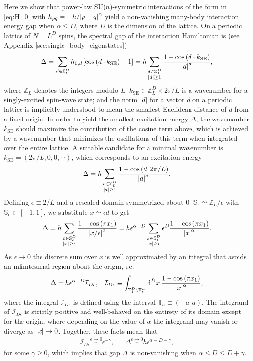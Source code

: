 \documentclass[nofootinbib,notitlepage,11pt]{revtex4-2}
\renewcommand{\t}{\text} %
\newcommand{\f}[2]{\dfrac{#1}{#2}} %
\newcommand{\p}[1]{\left(#1\right)} %
\renewcommand{\sp}[1]{\left[#1\right]} %
\renewcommand{\c}{\cdot} %
\newcommand{\1}{\mathds{1}}
\renewcommand{\d}{\text{d}}
\newcommand{\I}{\mathcal{I}}
\renewcommand{\SS}{\mathbb{S}}
\newcommand{\TT}{\mathbb{T}}
\newcommand{\ZZ}{\mathbb{Z}}
\begin{document}
Here we show that power-law SU($n$)-symmetric interactions of the form
in \eqref{eq:H_0} with $h_{pq}=-h/\abs{p-q}^\alpha$ yield a
non-vanishing many-body interaction energy gap when $\alpha\le D$,
where $D$ is the dimension of the lattice.  On a periodic lattice of
$N=L^D$ spins, the spectral gap of the interaction Hamiltonian is (see
Appendix \ref{sec:single_body_eigenstates})
\begin{align}
  \Delta
  = \sum_{d\in\ZZ_L^D} h_{0,d} \sp{\cos\p{d \c k_{\t{SE}}}-1}
  = h \sum_{\substack{d\in\ZZ_L^D\\\abs{d}\ge1}}
  \f{1-\cos\p{d \c k_{\t{SE}}}}{\abs{d}^\alpha},
\end{align}
where $\ZZ_L$ denotes the integers modulo $L$;
$k_{\t{SE}}\in\ZZ_L^D\times2\pi/L$ is a wavenumber for a
singly-excited spin-wave state; and the norm $\abs{d}$ for a vector
$d$ on a periodic lattice is implicitly understood to mean the
smallest Euclidean distance of $d$ from a fixed origin.  In order to
yield the smallest excitation energy $\Delta$, the wavenumber
$k_{\t{SE}}$ should maximize the contribution of the cosine term
above, which is achieved by a wavenumber that minimizes the
oscillations of this term when integrated over the entire lattice.  A
suitable candidate for a minimal wavenumber is
$k_{\t{SE}}=\p{2\pi/L,0,0,\cdots}$, which corresponds to an excitation
energy
\begin{align}
  \Delta = h \sum_{\substack{d\in\ZZ_L^D\\\abs{d}\ge1}}
  \f{1-\cos\p{d_12\pi/L}}{\abs{d}^\alpha}.
\end{align}
Defining $\epsilon\equiv2/L$ and a rescaled domain symmetrized about
$0$, $\SS_\epsilon\simeq\ZZ_L/\epsilon$ with
$\SS_\epsilon\subset\sp{-1,1}$, we substitute $x\simeq\epsilon d$ to
get
\begin{align}
  \Delta
  = h \sum_{\substack{x\in\SS_\epsilon^D\\\abs{x}\ge\epsilon}}
  \f{1-\cos\p{\pi x_1}}{\abs{x/\epsilon}^\alpha}
  = h \epsilon^{\alpha-D} \sum_{\substack{x\in\SS_L^D\\\abs{x}\ge\epsilon}}
  \epsilon^D \f{1-\cos\p{\pi x_1}}{\abs{x}^\alpha}.
\end{align}
As $\epsilon\to0$ the discrete sum over $x$ is well approximated by an
integral that avoids an infinitesimal region about the origin, i.e.
\begin{align}
  \Delta = h \epsilon^{\alpha-D} \I_{D\epsilon},
  &&
  \I_{D\epsilon}
  \equiv \int_{\TT_1^D\setminus\TT_\epsilon^D} \d^Dx\,
  \f{1-\cos\p{\pi x_1}}{\abs{x}^\alpha},
\end{align}
where the integral $\I_{D\epsilon}$ is defined using the interval
$\TT_a\equiv\p{-a,a}$.  The integrand of $\I_{D\epsilon}$ is strictly
positive and well-behaved on the entirety of its domain except for the
origin, where depending on the value of $\alpha$ the integrand may
vanish or diverge as $\abs{x}\to0$.  Together, these facts mean that
\begin{align}
  \I_{D\epsilon} \stackrel{\epsilon\to0}{\sim} \epsilon^{-\gamma},
  &&
  \Delta \stackrel{\epsilon\to0}{\sim} h \epsilon^{\alpha-D-\gamma},
\end{align}
for some $\gamma\ge0$, which implies that gap $\Delta$ is
non-vanishing when $\alpha\le D\le D+\gamma$.
\end{document}
